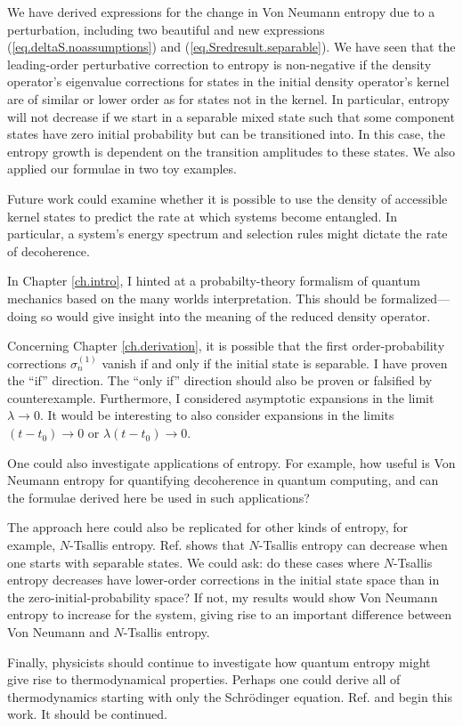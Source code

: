 We have derived expressions for the change in Von Neumann entropy due to a perturbation, including two beautiful and new expressions (\ref{eq.deltaS.noassumptions}) and (\ref{eq.Sredresult.separable}). We have seen that the leading-order perturbative correction to entropy is non-negative if the density operator's eigenvalue corrections for states in the initial density operator's kernel are of similar or lower order as for states not in the kernel. In particular, entropy will not decrease if we start in a separable mixed state such that some component states have zero initial probability but can be transitioned into. In this case, the entropy growth is dependent on the transition amplitudes to these states. We also applied our formulae in two toy examples.

Future work could examine whether it is possible to use the density of accessible kernel states to predict the rate at which systems become entangled. In particular, a system’s energy spectrum and selection rules might dictate the rate of decoherence.

In Chapter \ref{ch.intro}, I hinted at a probabilty-theory formalism of quantum mechanics based on the many worlds interpretation. This should be formalized---doing so would give insight into the meaning of the reduced density operator.

Concerning Chapter \ref{ch.derivation}, it is possible that the first order-probability corrections \(\sigma_n^{(1)}\) vanish if and only if the initial state is separable. I have proven the ``if'' direction. The ``only if'' direction should also be proven or falsified by counterexample. Furthermore, I considered asymptotic expansions in the limit \(\lambda \to 0\). It would be interesting to also consider expansions in the limits \(\left(t-t_0\right) \to 0\) or \(\lambda\left(t-t_0\right) \to 0\).

One could also investigate applications of entropy. For example, how useful is Von Neumann entropy for quantifying decoherence in quantum computing, and can the formulae derived here be used in such applications? 

The approach here could also be replicated for other kinds of entropy, for example, \(N\)-Tsallis entropy. Ref. \cite{cheung} shows that \(N\)-Tsallis entropy can decrease when one starts with separable states. We could ask: do these cases where \(N\)-Tsallis entropy decreases have lower-order corrections in the initial state space than in the zero-initial-probability space? If not, my results would show Von Neumann entropy to increase for the system, giving rise to an important difference between Von Neumann and \(N\)-Tsallis entropy.

Finally, physicists should continue to investigate how quantum entropy might give rise to thermodynamical properties. Perhaps one could derive all of thermodynamics starting with only the Schrödinger equation. Ref. \cite{bracken} and \cite{heusler} begin this work. It should be continued.
